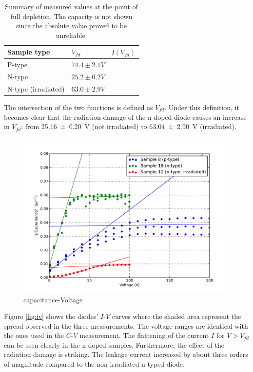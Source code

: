 \documentclass[11pt]{report}
\begin{document}
\begin{table}
  \caption{Summary of measured values at the point of full depletion. The capacity is not shown since the absolute value proved to be unreliable.}\label{tab:results}
  \centering
  \begin{tabular}{lll}
    \toprule
    Sample type         & $V_{fd}$                 & $I(V_{fd})$ \\
    \midrule
    P-type              & $74.4 \pm 2.1 \si{V}$   &           \\
    N-type              & $25.2 \pm 0.2 \si{V}$  &             \\
    N-type (irradiated) & $63.0 \pm 2.9 \si{V}$ &             \\
    \bottomrule
  \end{tabular}
\end{table}

 The intersection of the two functions is defined as $V_{fd}$.
Under this definition, it becomes clear that the radiation damage of the n-doped diode causes an increase in $V_{fd}$: from \SI{25.16\pm0.20}{V} (not irradiated) to \SI{63.04\pm2.90}{V} (irradiated).

\label{sec:results}
\begin{figure}
  \centering
  \includegraphics[width=\textwidth]{./figures/cv.pdf}  
  \caption{capacitance-Voltage }\label{fig:cv}
\end{figure}

Figure \ref{fig:iv} shows the diodes' $I$-$V$ curves where the shaded area represent the spread observed in the three measurements.
The voltage ranges are identical with the ones used in the $C$-$V$ measurement.
The flattening of the current $I$ for $V>V_{fd}$ can be seen clearly in the n-doped samples.
Furthermore, the effect of the radiation damage is striking.
The leakage current increased by about three orders of magnitude compared to the non-irradiated n-typed diode.
\end{document}
